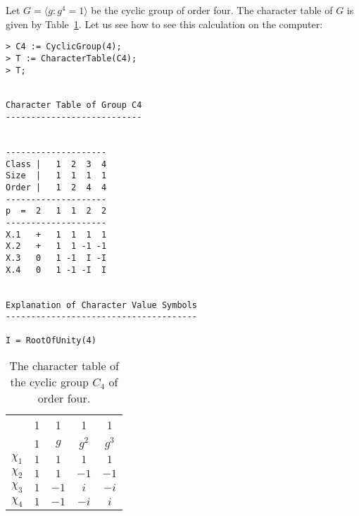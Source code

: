 \begin{example}
	Let $G=\langle g:g^4=1\rangle$ 
	be the cyclic group of order four. The character table of $G$ is given by Table~\ref{tab:C4}.  Let us see how to see this calculation on the computer:




\begin{lstlisting}
> C4 := CyclicGroup(4);
> T := CharacterTable(C4);
> T;


Character Table of Group C4
---------------------------


--------------------
Class |   1  2  3  4
Size  |   1  1  1  1
Order |   1  2  4  4
--------------------
p  =  2   1  1  2  2
--------------------
X.1   +   1  1  1  1
X.2   +   1  1 -1 -1
X.3   0   1 -1  I -I
X.4   0   1 -1 -I  I


Explanation of Character Value Symbols
--------------------------------------

I = RootOfUnity(4)    
\end{lstlisting}
    
	\begin{table}[h]
    \caption{The character table of the cyclic group $C_4$ of order four.}
    \label{tab:C4}
		\begin{tabular}{|c|cccc|}
			\hline 
			& 1 & 1 & 1 & 1\tabularnewline
			& $1$ & $g$ & $g^2$ & $g^{3}$\tabularnewline
			\hline 
			$\chi_{1}$ & $1$ & $1$ & $1$ & $1$\tabularnewline
			$\chi_{2}$ & $1$ & $1$ & $-1$ & $-1$ \tabularnewline
			$\chi_{3}$ & $1$ & $-1$ & $i$ & $-i$\tabularnewline
			$\chi_{4}$ & $1$ & $-1$ & $-i$ & $i$\tabularnewline
			\hline
		\end{tabular}
	\end{table}


\end{example}
